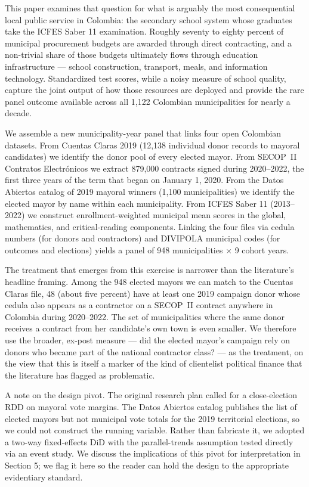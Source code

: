 \documentclass[12pt]{article}
\begin{document}
This paper examines that question for what is arguably the most consequential local public service in Colombia: the secondary school system whose graduates take the ICFES Saber 11 examination. Roughly seventy to eighty percent of municipal procurement budgets are awarded through direct contracting, and a non-trivial share of those budgets ultimately flows through education infrastructure --- school construction, transport, meals, and information technology. Standardized test scores, while a noisy measure of school quality, capture the joint output of how those resources are deployed and provide the rare panel outcome available across all 1{,}122 Colombian municipalities for nearly a decade.

We assemble a new municipality-year panel that links four open Colombian datasets. From Cuentas Claras 2019 (12{,}138 individual donor records to mayoral candidates) we identify the donor pool of every elected mayor. From SECOP~II Contratos Electr\'onicos we extract 879{,}000 contracts signed during 2020--2022, the first three years of the term that began on January 1, 2020. From the Datos Abiertos catalog of 2019 mayoral winners (1{,}100 municipalities) we identify the elected mayor by name within each municipality. From ICFES Saber 11 (2013--2022) we construct enrollment-weighted municipal mean scores in the global, mathematics, and critical-reading components. Linking the four files via cedula numbers (for donors and contractors) and DIVIPOLA municipal codes (for outcomes and elections) yields a panel of 948 municipalities $\times$ 9 cohort years.

The treatment that emerges from this exercise is narrower than the literature's headline framing. Among the 948 elected mayors we can match to the Cuentas Claras file, 48 (about five percent) have at least one 2019 campaign donor whose cedula also appears as a contractor on a SECOP~II contract anywhere in Colombia during 2020--2022. The set of municipalities where the same donor receives a contract from her candidate's own town is even smaller. We therefore use the broader, ex-post measure --- did the elected mayor's campaign rely on donors who became part of the national contractor class? --- as the treatment, on the view that this is itself a marker of the kind of clientelist political finance that the literature has flagged as problematic.

A note on the design pivot. The original research plan called for a close-election RDD on mayoral vote margins. The Datos Abiertos catalog publishes the list of elected mayors but not municipal vote totals for the 2019 territorial elections, so we could not construct the running variable. Rather than fabricate it, we adopted a two-way fixed-effects DiD with the parallel-trends assumption tested directly via an event study. We discuss the implications of this pivot for interpretation in Section 5; we flag it here so the reader can hold the design to the appropriate evidentiary standard.
\end{document}
